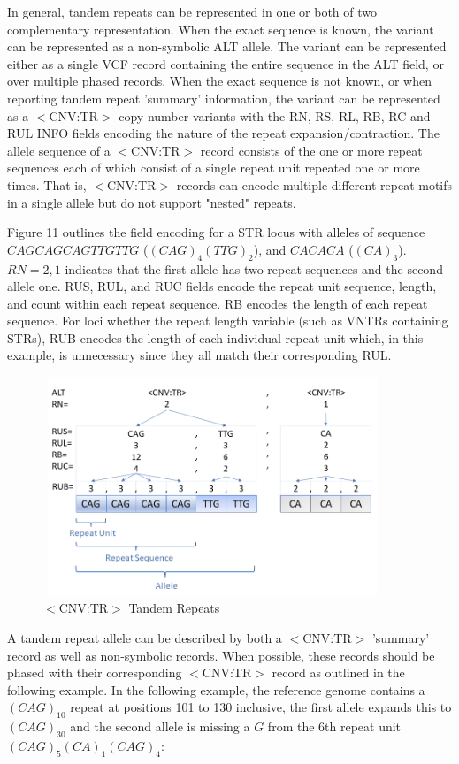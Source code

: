 \documentclass[8pt]{article}
\begin{document}
In general, tandem repeats can be represented in one or both of two complementary representation.
When the exact sequence is known, the variant can be represented as a non-symbolic ALT allele.
The variant can be represented either as a single VCF record containing the entire sequence in the ALT field, or over multiple phased records.
When the exact sequence is not known, or when reporting tandem repeat 'summary' information, the variant can be represented as a $<$CNV:TR$>$ copy number variants with the RN, RS, RL, RB, RC and RUL INFO fields encoding the nature of the repeat expansion/contraction.
The allele sequence of a $<$CNV:TR$>$ record consists of the one or more repeat sequences each of which consist of a single repeat unit repeated one or more times.
That is, $<$CNV:TR$>$ records can encode multiple different repeat motifs in a single allele but do not support "nested" repeats.

Figure 11 outlines the field encoding for a STR locus with alleles of sequence $CAGCAGCAGTTGTTG$ ($(CAG)_{4}(TTG)_{2}$), and $CACACA$ ($(CA)_{3}$).
$RN=2,1$ indicates that the first allele has two repeat sequences and the second allele one.
RUS, RUL, and RUC fields encode the repeat unit sequence, length, and count within each repeat sequence.
RB encodes the length of each repeat sequence.
For loci whether the repeat length variable (such as VNTRs containing STRs), RUB encodes the length of each individual repeat unit which, in this example, is unnecessary since they all match their corresponding RUL.

\begin{figure}[ht]
	\centering
	\includegraphics[width=4in,height=2.58in]{img/tandem_repeat_notation.png}
	\caption{$<$CNV:TR$>$ Tandem Repeats}
\end{figure}


A tandem repeat allele can be described by both a $<$CNV:TR$>$ 'summary' record as well as non-symbolic records.
When possible, these records should be phased with their corresponding $<$CNV:TR$>$ record as outlined in the following example.
In the following example, the reference genome contains a $(CAG)_{10}$ repeat at positions 101 to 130 inclusive, the first allele expands this to $(CAG)_{30}$ and the second allele is missing a $G$ from the 6th repeat unit $(CAG)_{5}(CA)_{1}(CAG)_{4}$:
\end{document}

